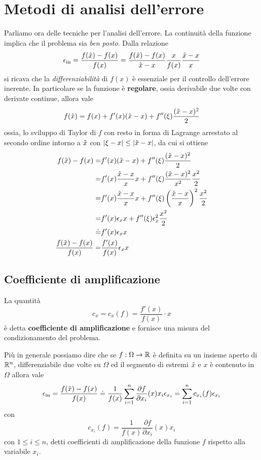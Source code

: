 \section{Metodi di analisi dell'errore}
Parliamo ora delle tecniche per l'analisi dell'errore. La continuità della funzione implica che il problema sia
\emph{ben posto}. Dalla relazione
\[
	\epsilon_\text{in} = \frac{f(\tilde{x}) - f(x)}{f(x)} =
	\frac{f(\tilde{x}) - f(x)}{\tilde{x} - x} \frac{x}{f(x)} \frac{\tilde{x} - x}{x}
\]
si ricava che la \emph{differenziabilità} di $f(x)$ è essenziale per il controllo dell'errore inerente. In
particolare se la funzione è \textbf{regolare}, ossia derivabile due volte con derivate continue, allora
vale
\[ f(\tilde{x}) = f(x) + f'(x) (\tilde{x} - x) + f''(\xi) \frac{(\tilde{x} - x)^2}{2} \]
ossia, lo sviluppo di Taylor di $f$ con resto in forma di Lagrange arrestato al secondo ordine intorno a
$\tilde{x}$ con $|\xi - x| \leq |\tilde{x} - x|$, da cui si ottiene
\begin{align*}
	f(\tilde{x}) - f(x) =              & f'(x) (\tilde{x} - x) + f''(\xi) \frac{(\tilde{x} - x)^2}{2} \\
	=                            & f'(x) \frac{\tilde{x} - x}{x} x +
	f''(\xi) \frac{(\tilde{x} - x)^2}{x^2} \frac{x^2}{2}                                  \\
	=                            & f'(x) \frac{\tilde{x} - x}{x} x +
	f''(\xi) \left( \frac{\tilde{x} - x}{x} \right)^2 \frac{x^2}{2}                       \\
	=                            & f'(x) \epsilon_x x +
	f''(\xi) \epsilon_x^2 \frac{x^2}{2}                                             \\
	\doteq                       & f'(x) \epsilon_x x                               \\
	\frac{f(\tilde{x}) - f(x)}{f(x)} = & \frac{f'(x)}{f(x)} \epsilon_x x
\end{align*}

\subsection{Coefficiente di amplificazione}
\begin{definition}
	La quantità
	\[ c_x = c_x (f) = \frac{f'(x)}{f(x)} \cdot x \]
	è detta \textbf{coefficiente di amplificazione} e fornisce una misura del condizionamento del problema.
\end{definition}

Più in generale possiamo dire che se $f : \Omega \to \mathbb{R}$ è definita su un insieme aperto di $\mathbb{R}^n$, differenziabile
due volte su $\Omega$ ed il segmento di estremi $\tilde{x}$ e $x$ è contenuto in $\Omega$ allora vale
\[
	\epsilon_\text{in} = \frac{f(\tilde{x}) - f(x)}{f(x)} \doteq
	\frac{1}{f(x)} \sum_{i=1}^n \frac{\partial f}{\partial x_i} (x) x_i \epsilon_{x_i} =
	\sum_{i=1}^n c_{x_i} (f) \epsilon_{x_i}
\]
con
\[ c_{x_i} (f) = \frac{1}{f(x)} \frac{\partial f}{\partial x_i} (x) x_i \]
con $1 \leq i \leq n$, detti coefficienti di amplificazione della funzione $f$ rispetto alla variabile $x_i$.

